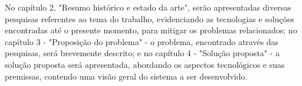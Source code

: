 No capítulo 2, "Resumo histórico e estado da arte", serão apresentadas diversas pesquisas 
referentes ao tema do trabalho, evidenciando as tecnologias e soluções encontradas até o 
presente momento, para mitigar os problemas relacionados; no capítulo 3 - "Proposição do 
problema" - o problema, encontrado através das pesquisas, será brevemente descrito; e no 
capítulo 4 - "Solução proposta" - a solução proposta será apresentada, abordando os 
aspectos tecnológicos e suas premissas, contendo uma visão geral do sistema a ser 
desenvolvido.